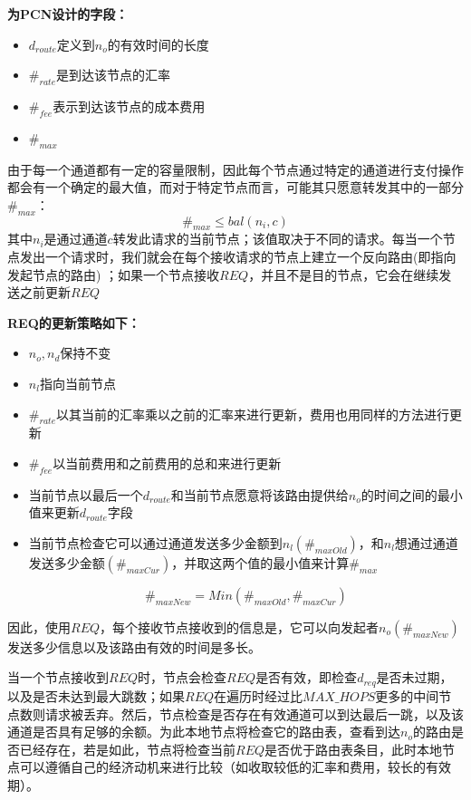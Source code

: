 \documentclass[12pt,a4paper]{article}
\begin{document}
\textbf{为PCN设计的字段：}
\begin{itemize}
\item $d_{route}$定义到$n_o$的有效时间的长度
\item $\#_{rate}$是到达该节点的汇率
\item $\#_{fee}$表示到达该节点的成本费用
\item $\#_{max}$
\end{itemize}

由于每一个通道都有一定的容量限制，因此每个节点通过特定的通道进行支付操作都会有一个确定的最大值，而对于特定节点而言，可能其只愿意转发其中的一部分$\#_{max}$：
\begin{equation}
\#_{max} \leq bal(n_i,c)
\end{equation}
其中$n_i$是通过通道$c$转发此请求的当前节点；该值取决于不同的请求。每当一个节点发出一个请求时，我们就会在每个接收请求的节点上建立一个反向路由(即指向发起节点的路由) ；如果一个节点接收$REQ$，并且不是目的节点，它会在继续发送之前更新$REQ$

\textbf{REQ的更新策略如下：}
\begin{itemize}
\item $n_o, n_d$保持不变
\item $n_l$指向当前节点
\item $\#_{rate}$以其当前的汇率乘以之前的汇率来进行更新，费用也用同样的方法进行更新
\item $\#_{fee}$以当前费用和之前费用的总和来进行更新
\item 当前节点以最后一个$d_{route}$和当前节点愿意将该路由提供给$n_o$的时间之间的最小值来更新$d_{route}$字段
\item 当前节点检查它可以通过通道发送多少金额到$n_l (\#_{maxOld})$，和$n_l$想通过通道发送多少金额$(\#_{maxCur})$，并取这两个值的最小值来计算$\#_{max}$

\begin{equation}
\#_{maxNew}=Min(\#_{maxOld},\#_{maxCur})
\end{equation}
\end{itemize}
因此，使用$REQ$，每个接收节点接收到的信息是，它可以向发起者$n_o(\#_{maxNew})$发送多少信息以及该路由有效的时间是多长。

当一个节点接收到$REQ$时，节点会检查$REQ$是否有效，即检查$d_{req}$是否未过期，以及是否未达到最大跳数；如果$REQ$在遍历时经过比$MAX\_HOPS$更多的中间节点数则请求被丢弃。然后，节点检查是否存在有效通道可以到达最后一跳，以及该通道是否具有足够的余额。为此本地节点将检查它的路由表，查看到达$n_o$的路由是否已经存在，若是如此，节点将检查当前$REQ$是否优于路由表条目，此时本地节点可以遵循自己的经济动机来进行比较（如收取较低的汇率和费用，较长的有效期）。
\end{document}
